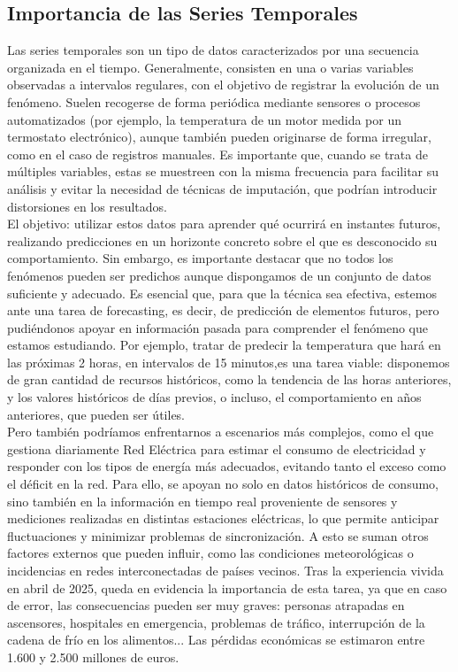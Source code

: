 \subsection{Importancia de las Series Temporales}

Las series temporales son un tipo de datos caracterizados por una secuencia organizada en el tiempo. Generalmente, consisten en una o varias variables observadas a intervalos regulares, con el objetivo de registrar la evolución de un fenómeno. Suelen recogerse de forma periódica mediante sensores o procesos automatizados (por ejemplo, la temperatura de un motor medida por un termostato electrónico), aunque también pueden originarse de forma irregular, como en el caso de registros manuales. Es importante que, cuando se trata de múltiples variables, estas se muestreen con la misma frecuencia para facilitar su análisis y evitar la necesidad de técnicas de imputación, que podrían introducir distorsiones en los resultados.\\

El objetivo: utilizar estos datos para aprender qué ocurrirá en instantes futuros, realizando predicciones en un horizonte concreto sobre el que es desconocido su comportamiento. Sin embargo, es importante destacar que no todos los fenómenos pueden ser predichos aunque dispongamos de un conjunto de datos suficiente y adecuado. Es esencial que, para que la técnica sea efectiva, estemos ante una tarea de forecasting, es decir, de predicción de elementos futuros, pero pudiéndonos apoyar en información pasada para comprender el fenómeno que estamos estudiando. Por ejemplo, tratar de predecir la temperatura que hará en las próximas 2 horas, en intervalos de 15 minutos,es una tarea viable: disponemos de gran cantidad de recursos históricos, como la tendencia de las horas anteriores, y los valores históricos de días previos, o incluso, el comportamiento en años anteriores, que pueden ser útiles.\\

Pero también podríamos enfrentarnos a escenarios más complejos, como el que gestiona diariamente Red Eléctrica para estimar el consumo de electricidad y responder con los tipos de energía más adecuados, evitando tanto el exceso como el déficit en la red. Para ello, se apoyan no solo en datos históricos de consumo, sino también en la información en tiempo real proveniente de sensores y mediciones realizadas en distintas estaciones eléctricas, lo que permite anticipar fluctuaciones y minimizar problemas de sincronización. A esto se suman otros factores externos que pueden influir, como las condiciones meteorológicas o incidencias en redes interconectadas de países vecinos.
Tras la experiencia vivida en abril de 2025, queda en evidencia la importancia de esta tarea, ya que en caso de error, las consecuencias pueden ser muy graves: personas atrapadas en ascensores, hospitales en emergencia, problemas de tráfico, interrupción de la cadena de frío en los alimentos...
Las pérdidas económicas se estimaron entre 1.600 y 2.500 millones de euros.\\

